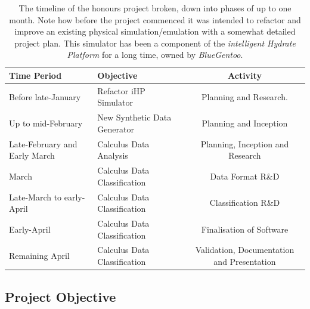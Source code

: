 \documentclass[main.tex]{subfiles}
\begin{document}
    \begin{table}[h]
      \centering
      \caption{The timeline of the honours project broken, down into phases of up to one month. Note how before the project commenced it was intended to refactor and improve an existing physical simulation/emulation with a somewhat detailed project plan. This simulator has been a component of the \textit{intelligent Hydrate Platform} for a long time, owned by \textit{BlueGentoo}.}
      \begin{tabularx}{\linewidth}{ X | X c }
        \hline
        Time Period & Objective & Activity \\
        \hline \hline
        Before late-January & Refactor iHP Simulator & Planning and Research. \\ \hline
        Up to mid-February & New Synthetic Data Generator & Planning and Inception \\ \hline
        Late-February and Early March & Calculus Data Analysis & Planning, Inception and Research \\ \hline
        March & Calculus Data Classification & Data Format R\&D \\ \hline
        Late-March to early-April & Calculus Data Classification & Classification R\&D \\ \hline
        Early-April & Calculus Data Classification & Finalisation of Software \\ \hline   
        Remaining April & Calculus Data Classification & Validation, Documentation and Presentation \\ \hline
        \hline
      \end{tabularx}
      \label{tbl:timeline}
    \end{table} 
    
    \subsection{Project Objective}
  
\end{document}
